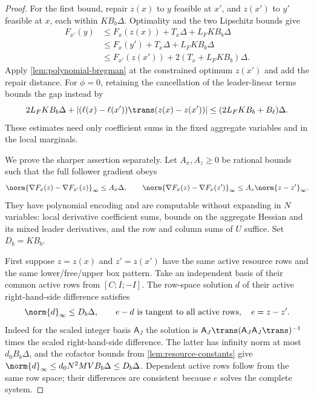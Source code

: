 \begin{proof}
For the first bound, repair $z(x)$ to $y$ feasible at $x'$, and
$z(x')$ to $y'$ feasible at $x$, each within $KB_b\Delta$.
Optimality and the two Lipschitz bounds give
\[
 \begin{split}
 F_{x'}(y)&\le F_x(z(x))+T_x\Delta+L_FKB_b\Delta\\
 &\le F_x(y')+T_x\Delta+L_FKB_b\Delta\\
 &\le F_{x'}(z(x'))+2(T_x+L_FKB_b)\Delta.
 \end{split}
\]
Apply \cref{lem:polynomial-bregman} at the constrained optimum
$z(x')$ and add the repair distance. For $\phi=0$, retaining the
cancellation of the leader-linear terms bounds the gap instead by
\[
 2L_FKB_b\Delta+
 |(\ell(x)-\ell(x'))\trans(z(x)-z(x'))|
                         \le(2L_FKB_b+B_\ell)\Delta.
\]
These estimates need only coefficient sums in the fixed aggregate
variables and in the local marginals.

We prove the sharper assertion separately. Let $A_x,A_z\ge0$ be
rational bounds such that the full follower gradient obeys
\[
 \norm{\nabla F_x(z)-\nabla F_{x'}(z)}_\infty\le A_x\Delta,
 \qquad
 \norm{\nabla F_x(z)-\nabla F_x(z')}_\infty\le A_z\norm{z-z'}_\infty.
\]
They have polynomial encoding and are computable without expanding in
$N$ variables: local derivative coefficient sums, bounds on the
aggregate Hessian and its mixed leader derivatives, and the row and
column sums of $U$ suffice. Set $D_b=KB_b$.

First suppose $z=z(x)$ and $z'=z(x')$ have the same active resource
rows and the same lower/free/upper box pattern. Take an independent
basis of their common active rows from $[C;I;-I]$. The row-space
solution $d$ of their active right-hand-side difference satisfies
\begin{equation}\label{eq:active-row-correction}
       \norm{d}_\infty\le D_b\Delta,\qquad
               e-d\text{ is tangent to all active rows},\quad e=z-z'.
\end{equation}
Indeed for the scaled integer basis $\mathsf A_J$ the solution is
$\mathsf A_J\trans(\mathsf A_J\mathsf A_J\trans)^{-1}$ times
the scaled right-hand-side difference. The latter has infinity norm
at most $d_0B_b\Delta$, and the cofactor bounds from
\cref{lem:resource-constants} give
$\norm{d}_\infty\le d_0N^2MV B_b\Delta\le D_b\Delta$.
Dependent active rows follow from the same row space; their differences
are consistent because $e$ solves the complete system.


\end{proof}
